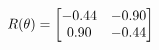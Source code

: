 \documentclass[preview]{standalone}
\begin{document}
\begin{align*}
\special{dvisvgm:raw <g id='unique000'>}R(\theta) = \begin{bmatrix}-0.44 & -0.90\\0.90 & -0.44\end{bmatrix}\special{dvisvgm:raw </g>}
\end{align*}
\end{document}
